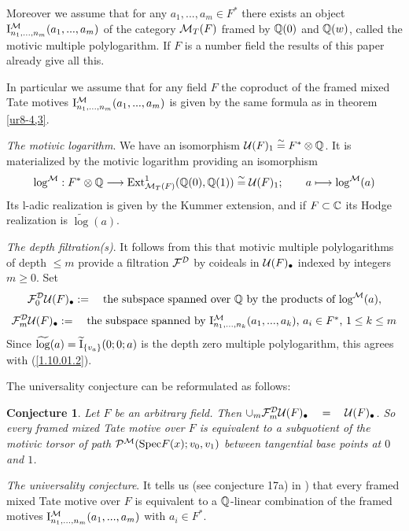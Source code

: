 \documentclass[10pt]{article}
\newtheorem{conjecture}[theorem]{Conjecture}
\begin{document}
Moreover we assume that for any  $a_1, ..., a_m \in F^*$ there exists an 
object ${\rm I}^{{\cal M}}_{n_1, ..., n_m}(a_1, ..., a_m)$ 
of the category ${\cal M}_T(F)$ framed by ${\mathbb Q}(0)$ and ${\mathbb Q}(w)$, called the motivic 
multiple polylogarithm. If $F$ is a number field the results of this paper  
already give  all this. 


In particular we assume that for any field $F$ the coproduct of the 
framed mixed Tate motives ${\rm I}^{{\cal M}}_{n_1, ..., n_m}(a_1, ..., a_m)$ is given by the 
same formula as in theorem \ref{ur8-4,3}. 

{\it The motivic logarithm}. We have an  isomorphism ${\cal U}(F)_{1} \stackrel{\sim}{=}
 F^{*}\otimes {\mathbb Q}$. It is materialized by the motivic logarithm providing an isomorphism 
$$
\log^{{\cal M}}:  F^* \otimes {\mathbb Q} \longrightarrow  {\rm Ext}_{{\cal M}_T(F)}^1({\mathbb Q}(0), {\mathbb Q}(1)) 
 \stackrel{\sim}{=}  {\cal U}(F)_{1}; \qquad a \longmapsto 
\log^{{\cal M}}(a)
$$  
Its l-adic realization is given by the Kummer extension, and if $F \subset {\mathbb C}$ its Hodge 
realization is  $\widetilde \log (a)$.  

{\it The depth filtration(s)}. It follows from this that motivic multiple polylogarithms 
of depth $\leq m$ provide a  filtration ${\cal F}^{\cal D}$ 
by coideals  in  ${\cal U}(F)_{\bullet}$ indexed by integers $m \geq 0$. Set
$$
{\cal F}_{0}^{\cal D}{\cal U}(F)_{\bullet} : = 
\quad \mbox{the subspace spanned over ${\mathbb Q}$ by the products of $\log^{{\cal M}} (a)$},  
$$
\begin{equation} \label{1.10.01.2}
{\cal F}_{m}^{\cal D}{\cal U}(F)_{\bullet}:= \quad \mbox{the subspace spanned by 
${\rm I}^{{\cal M}}_{n_1, ..., n_k}(a_1, ..., a_k)$, $a_i \in F^*$,  $1 \leq k \leq m$}
\end{equation}
Since 
$\widetilde \log (a) = \widetilde {\rm I}_{\{v_a\}}(0; 0; a)$ is 
the depth zero multiple polylogarithm, this agrees with (\ref{1.10.01.2}). 

The universality conjecture  can be reformulated as follows: 
\begin{conjecture} \label{1.10.01.3} Let $F$ be an arbitrary field. Then  
$
\cup_m {\cal F}_{m}^{\cal D}{\cal U}(F)_{\bullet} \quad = \quad {\cal U}(F)_{\bullet}
$. So  every framed mixed Tate motive over $F$ is equivalent to a subquotient of 
the motivic torsor of path ${\cal P}^{{\cal M}}({\rm Spec} F(x); v_0, v_1)$ between tangential base points at $0$ and $1$. 
\end{conjecture}

{\it The universality conjecture}. 
It tells us 
(see conjecture 17a) in \cite{G1}) that 
every 
framed mixed Tate motive over $F$ is equivalent to a ${\mathbb Q}$-linear combination of 
the framed motives ${\rm I}^{{\cal M}}_{n_1, ..., n_m}(a_1, ..., a_m)$ with $a_i \in F^*$. 
\end{document}
